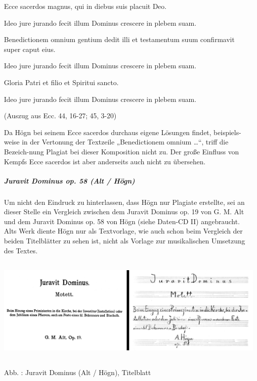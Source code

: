 Ecce sacerdos magnus, qui in diebus suis placuit Deo.

Ideo jure jurando fecit illum Dominus crescere in plebem suam.

Benedictionem omnium gentium dedit illi et testamentum suum confirmavit
super caput eius.

Ideo jure jurando fecit illum Dominus crescere in plebem suam.

Gloria Patri et filio et Spiritui sancto.

Ideo jure jurando fecit illum Dominus crescere in plebem suam.

(Auszug aus Ecc. 44, 16-27; 45, 3-20)

Da Högn bei seinem Ecce sacerdos durchaus eigene Lösungen findet,
beispiels-weise in der Vertonung der Textzeile „Benedictionem omnium
…“, triff die Bezeich-nung Plagiat bei dieser Komposition nicht zu. Der
große Einfluss von Kempfs Ecce sacerdos ist aber anderseits auch nicht
zu übersehen.

\clearpage\subparagraph{Juravit Dominus op. 58 (Alt / Högn)}
Um nicht den Eindruck zu hinterlassen, dass Högn nur Plagiate erstellte,
sei an dieser Stelle ein Vergleich zwischen dem Juravit Dominus op. 19
von G. M. Alt und dem Juravit Dominus op. 58 von Högn (siehe Daten-CD
II) angebraucht. Alts Werk diente Högn nur als Textvorlage, wie auch
schon beim Vergleich der beiden Titelblätter zu sehen ist, nicht als
Vorlage zur musikalischen Umsetzung des Textes.


\includegraphics[width=15.977cm,height=5.128cm]{pictures/zulassungsarbeit-img088.png}


Abb. : Juravit Dominus (Alt / Högn),
Titelblatt


